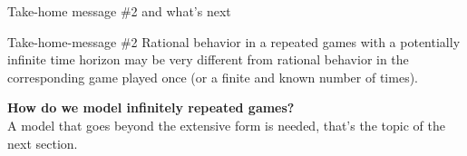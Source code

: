 \begin{frame}{Take-home message \#2 and what's next}
    \begin{block}{Take-home-message \#2}
        Rational behavior in a repeated games with a potentially infinite time horizon may be
        very different from rational behavior in the corresponding game played once (or a finite
        and known number of times).
    \end{block}

    \vspace{1cm}
    \textbf{{\color{orange}How do we model infinitely repeated games?}}\\
    A model that goes beyond the extensive form is needed, that's the topic of the next section.
\end{frame}

